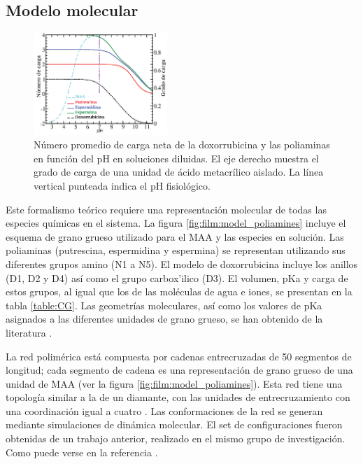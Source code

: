 

\subsection{Modelo molecular}
\label{sub:film:modelo-molecular}


\begin{figure}[ht]
	\centering
	\includegraphics[width=0.45\textwidth]{Figures/graph-film/chargeAds.pdf}
	\caption{N\'umero promedio de carga neta de la doxorrubicina y las poliaminas en funci\'on del pH en soluciones diluidas.
		El eje derecho muestra el grado de carga de una unidad de \'acido metacr\'ilico aislado. La l\'inea vertical punteada indica el pH fisiol\'ogico.}
	\label{fig:film:model}
\end{figure}


Este formalismo te\'orico requiere una representaci\'on molecular de todas las especies qu\'imicas en el sistema. La figura \ref{fig:film:model_poliamines} incluye el esquema de grano grueso utilizado para el MAA y las especies en soluci\'on. Las poliaminas (putrescina, espermidina y espermina) se representan utilizando sus diferentes grupos amino (N1 a N5). El modelo de doxorrubicina incluye los anillos (D1, D2 y D4) as\'i como el grupo carbox'ilico (D3). El volumen, pKa y carga de estos grupos, al igual que los de las mol\'eculas de agua e iones, se presentan en la tabla \ref{table:CG}. Las geometr\'ias moleculares, as\'i como los valores de pKa asignados a las diferentes unidades de grano grueso, se han obtenido de la literatura \cite{agostinelli2010polyamines,casero2009,puchem}.

La red polim\'erica est\'a compuesta por cadenas entrecruzadas de 50 segmentos de longitud; cada segmento de cadena es una representaci\'on de grano grueso de una unidad de MAA (ver la figura \ref{fig:film:model_poliamines}). Esta red tiene una topolog\'ia similar a la de un diamante, con las unidades de entrecruzamiento con una coordinaci\'on igual a cuatro  \cite{Mann2005,QuesadaPerez2012M,Kosovan2015,Hofzumahaus2018}. Las conformaciones de la red se generan mediante simulaciones de din\'amica molecular. El set de configuraciones fueron obtenidas de un trabajo anterior, realizado en el mismo grupo de investigaci\'on. Como puede verse en la referencia  \cite{hagemann2018use}.



